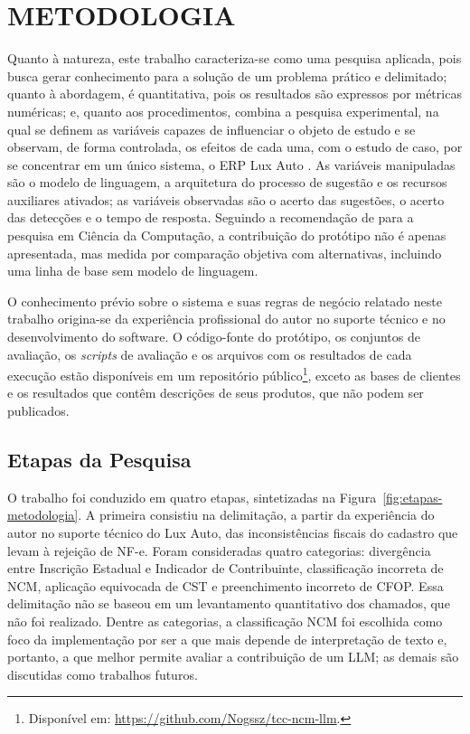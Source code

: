 \chapter{METODOLOGIA}
\label{cap:metodologia}

Quanto à natureza, este trabalho caracteriza-se como uma pesquisa aplicada, pois busca gerar conhecimento para a solução de um problema prático e delimitado; quanto à abordagem, é quantitativa, pois os resultados são expressos por métricas numéricas; e, quanto aos procedimentos, combina a pesquisa experimental, na qual se definem as variáveis capazes de influenciar o objeto de estudo e se observam, de forma controlada, os efeitos de cada uma, com o estudo de caso, por se concentrar em um único sistema, o ERP Lux Auto \cite{gil2022}. As variáveis manipuladas são o modelo de linguagem, a arquitetura do processo de sugestão e os recursos auxiliares ativados; as variáveis observadas são o acerto das sugestões, o acerto das detecções e o tempo de resposta. Seguindo a recomendação de  para a pesquisa em Ciência da Computação, a contribuição do protótipo não é apenas apresentada, mas medida por comparação objetiva com alternativas, incluindo uma linha de base sem modelo de linguagem.

O conhecimento prévio sobre o sistema e suas regras de negócio relatado neste trabalho origina-se da experiência profissional do autor no suporte técnico e no desenvolvimento do software. O código-fonte do protótipo, os conjuntos de avaliação, os \textit{scripts} de avaliação e os arquivos com os resultados de cada execução estão disponíveis em um repositório público\footnote{Disponível em: \url{https://github.com/Nogssz/tcc-ncm-llm}.}, exceto as bases de clientes e os resultados que contêm descrições de seus produtos, que não podem ser publicados.

\section{Etapas da Pesquisa}

O trabalho foi conduzido em quatro etapas, sintetizadas na Figura~\ref{fig:etapas-metodologia}. A primeira consistiu na delimitação, a partir da experiência do autor no suporte técnico do Lux Auto, das inconsistências fiscais do cadastro que levam à rejeição de NF-e. Foram consideradas quatro categorias: divergência entre Inscrição Estadual e Indicador de Contribuinte, classificação incorreta de NCM, aplicação equivocada de CST e preenchimento incorreto de CFOP. Essa delimitação não se baseou em um levantamento quantitativo dos chamados, que não foi realizado. Dentre as categorias, a classificação NCM foi escolhida como foco da implementação por ser a que mais depende de interpretação de texto e, portanto, a que melhor permite avaliar a contribuição de um LLM; as demais são discutidas como trabalhos futuros.

